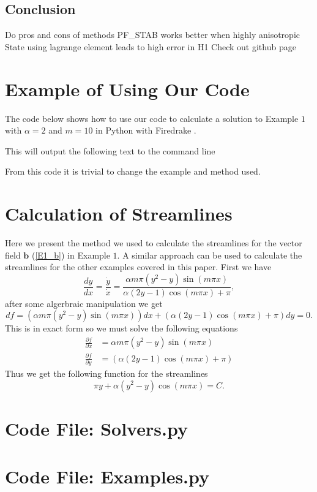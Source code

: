 \documentclass[12pt]{ociamthesis}
\begin{document}
\section{Conclusion}
Do pros and cons of methods
PF_STAB works better when highly anisotropic
State using lagrange element leads to high error in H1
Check out github page \cite{Hub}

\printbibliography[heading=bibintoc]

\appendix

\chapter{Example of Using Our Code}
The code below shows how to use our code to calculate a solution to Example $1$ with $\alpha=2$ and $m=10$ in Python with Firedrake \cite{Dragon}.

This will output the following text to the command line

From this code it is trivial to change the example and method used.

\chapter{Calculation of Streamlines} \label{E1_Stream_Calc}
Here we present the method we used to calculate the streamlines for the vector field $\mathbf{b}$ (\ref{E1_b}) in Example $1$. A similar approach can be used to calculate the streamlines for the other examples covered in this paper. First we have
\begin{equation}
\frac{dy}{dx} = \frac{\dot{y}}{\dot{x}} = 
\frac{\alpha m \pi (y^2-y)\sin(m \pi x)}{\alpha(2y-1)\cos(m\pi x) + \pi},
\end{equation}
after some algerbraic manipulation we get
\begin{equation}
df = (\alpha m\pi (y^2-y)\sin(m\pi x))dx + 
(\alpha(2y-1)\cos(m\pi x)+\pi)dy = 0.
\end{equation}
This is in exact form so we must solve the following equations
\begin{align}
\frac{\partial f}{\partial x} &= \alpha m\pi (y^2-y)\sin(m\pi x)\\
\frac{\partial f}{\partial y} &= (\alpha(2y-1)\cos(m\pi x)+\pi)
\end{align}
Thus we get the following function for the streamlines
\begin{equation}
\pi y + \alpha (y^2-y)\cos(m\pi x) = C.
\end{equation}

\chapter{Code File: Solvers.py} \label{CFSolve}

\chapter{Code File: Examples.py} \label{CFExample}
\end{document}
